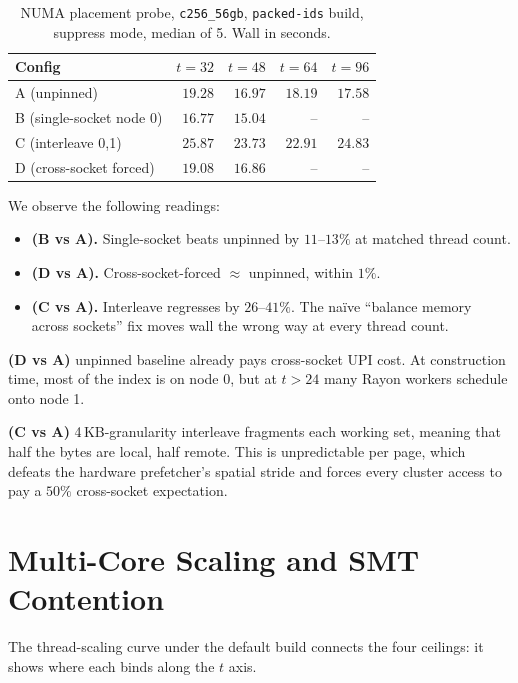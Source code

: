 \begin{table}[H]
  \centering
  \caption[NUMA placement probe.]{NUMA placement probe, \texttt{c256\_56gb}, \texttt{packed-ids} build, suppress mode, median of 5. Wall in seconds.}
  \label{tab:numa}
  \begin{tabular}{lrrrr}
    \toprule
    Config & $t{=}32$ & $t{=}48$ & $t{=}64$ & $t{=}96$ \\
    \midrule
    A (unpinned) & $19.28$ & $16.97$ & $18.19$ & $17.58$ \\
    B (single-socket node 0) & $\mathbf{16.77}$ & $\mathbf{15.04}$ & -- & -- \\
    C (interleave 0,1) & $25.87$ & $23.73$ & $22.91$ & $24.83$ \\
    D (cross-socket forced) & $19.08$ & $16.86$ & -- & -- \\
    \bottomrule
  \end{tabular}
\end{table}

We observe the following readings:

\begin{itemize}
  \item \textbf{(B vs A).} Single-socket beats unpinned by $11$--$13\%$ at matched thread count.
  \item \textbf{(D vs A).} Cross-socket-forced $\approx$ unpinned, within $1\%$.
  \item \textbf{(C vs A).} Interleave regresses by $26$--$41\%$. The naïve ``balance memory across sockets'' fix moves wall the wrong way at every thread count.
\end{itemize}

\textbf{(D vs A)} unpinned baseline already pays cross-socket UPI cost. At construction time, most of the index is on node 0, but at $t > 24$ many Rayon workers schedule onto node 1.


\textbf{(C vs A)} 4\,KB-granularity interleave fragments each working set, meaning that half the bytes are local, half remote. This is unpredictable per page, which defeats the hardware prefetcher's spatial stride and forces every cluster access to pay a $50\%$ cross-socket expectation. 

\section{Multi-Core Scaling and SMT Contention\label{sec:exp:scaling}}

The thread-scaling curve under the default build connects the four ceilings: it shows where each binds along the $t$ axis.

